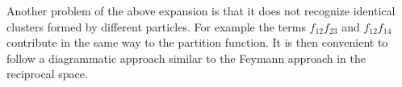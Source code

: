 \documentclass[../../Main/Main.tex]{subfiles}
\begin{document}
\begin{figure}[H]
\begin{minipage}[c]{0.5\linewidth}
\end{minipage}
\begin{minipage}[]{0.5\linewidth}
\centering
{}
\end{minipage}
\caption{\label{fig:} }
\end{figure} Another problem of the above expansion is that it does not recognize identical clusters formed by different particles. For example the terms \( f_{12} f_{23} \) and \( f_{12}f_{14} \) contribute in the same way to the partition function. It is then convenient to follow a diagrammatic approach similar to the Feymann approach in the reciprocal space.
\end{document}
